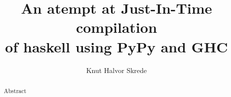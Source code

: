 \documentclass{article}
\begin{document}
\title{An atempt at Just-In-Time compilation\\of haskell using PyPy and GHC}
\author{Knut Halvor Skrede}
\maketitle

\begin{abstract}
Abstract
\end{abstract}

\clearpage

\tableofcontents

\clearpage

\setlength\LTleft{0pt}
\setlength\LTright{0pt}


















\end{document}
